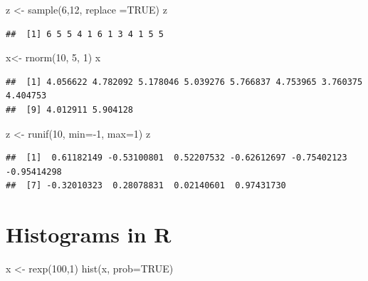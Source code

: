 \documentclass[
]{article}
\newenvironment{Shaded}{\begin{snugshade}}{\end{snugshade}}
\newcommand{\AttributeTok}[1]{\textcolor[rgb]{0.77,0.63,0.00}{#1}}
\newcommand{\ConstantTok}[1]{\textcolor[rgb]{0.00,0.00,0.00}{#1}}
\newcommand{\DecValTok}[1]{\textcolor[rgb]{0.00,0.00,0.81}{#1}}
\newcommand{\FunctionTok}[1]{\textcolor[rgb]{0.00,0.00,0.00}{#1}}
\newcommand{\NormalTok}[1]{#1}
\newcommand{\OtherTok}[1]{\textcolor[rgb]{0.56,0.35,0.01}{#1}}
\newcommand{\SpecialCharTok}[1]{\textcolor[rgb]{0.00,0.00,0.00}{#1}}
\theoremstyle{definition}
\theoremstyle{definition}
\theoremstyle{definition}
\theoremstyle{remark}
\begin{document}
\begin{Shaded}
\begin{Highlighting}[]
\NormalTok{z }\OtherTok{\textless{}{-}} \FunctionTok{sample}\NormalTok{(}\DecValTok{6}\NormalTok{,}\DecValTok{12}\NormalTok{, }\AttributeTok{replace =}\ConstantTok{TRUE}\NormalTok{)}
\NormalTok{z}
\end{Highlighting}
\end{Shaded}

\begin{verbatim}
##  [1] 6 5 5 4 1 6 1 3 4 1 5 5
\end{verbatim}

\begin{Shaded}
\begin{Highlighting}[]
\NormalTok{x}\OtherTok{\textless{}{-}} \FunctionTok{rnorm}\NormalTok{(}\DecValTok{10}\NormalTok{, }\DecValTok{5}\NormalTok{, }\DecValTok{1}\NormalTok{)}
\NormalTok{x}
\end{Highlighting}
\end{Shaded}

\begin{verbatim}
##  [1] 4.056622 4.782092 5.178046 5.039276 5.766837 4.753965 3.760375 4.404753
##  [9] 4.012911 5.904128
\end{verbatim}

\begin{Shaded}
\begin{Highlighting}[]
\NormalTok{z }\OtherTok{\textless{}{-}} \FunctionTok{runif}\NormalTok{(}\DecValTok{10}\NormalTok{, }\AttributeTok{min=}\SpecialCharTok{{-}}\DecValTok{1}\NormalTok{, }\AttributeTok{max=}\DecValTok{1}\NormalTok{)}
\NormalTok{z}
\end{Highlighting}
\end{Shaded}

\begin{verbatim}
##  [1]  0.61182149 -0.53100801  0.52207532 -0.62612697 -0.75402123 -0.95414298
##  [7] -0.32010323  0.28078831  0.02140601  0.97431730
\end{verbatim}

\hypertarget{histograms-in-r}{%
\section{Histograms in R}\label{histograms-in-r}}

\begin{Shaded}
\begin{Highlighting}[]
\NormalTok{x }\OtherTok{\textless{}{-}} \FunctionTok{rexp}\NormalTok{(}\DecValTok{100}\NormalTok{,}\DecValTok{1}\NormalTok{)}
\FunctionTok{hist}\NormalTok{(x, }\AttributeTok{prob=}\ConstantTok{TRUE}\NormalTok{)}
\end{Highlighting}
\end{Shaded}
\end{document}
